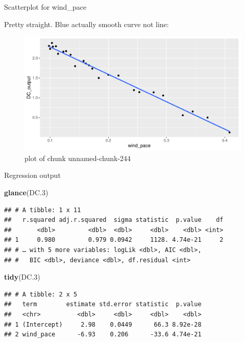 \documentclass[ignorenonframetext,]{beamer}
\newenvironment{Shaded}{\begin{snugshade}}{\end{snugshade}}
\newcommand{\FloatTok}[1]{\textcolor[rgb]{0.00,0.00,0.81}{#1}}
\newcommand{\KeywordTok}[1]{\textcolor[rgb]{0.13,0.29,0.53}{\textbf{#1}}}
\newcommand{\NormalTok}[1]{#1}
\begin{document}
\begin{frame}{Scatterplot for wind\_pace}
\protect\hypertarget{scatterplot-for-wind_pace}{}

Pretty straight. Blue actually smooth curve not line:

\begin{figure}
\centering
\includegraphics{figure/unnamed-chunk-244-1.pdf}
\caption{plot of chunk unnamed-chunk-244}
\end{figure}

\end{frame}

\begin{frame}[fragile]{Regression output}
\protect\hypertarget{regression-output}{}

\begin{Shaded}
\begin{Highlighting}[]
\KeywordTok{glance}\NormalTok{(DC}\FloatTok{.3}\NormalTok{)}
\end{Highlighting}
\end{Shaded}

\begin{verbatim}
## # A tibble: 1 x 11
##   r.squared adj.r.squared  sigma statistic  p.value    df
##       <dbl>         <dbl>  <dbl>     <dbl>    <dbl> <int>
## 1     0.980         0.979 0.0942     1128. 4.74e-21     2
## # … with 5 more variables: logLik <dbl>, AIC <dbl>,
## #   BIC <dbl>, deviance <dbl>, df.residual <int>
\end{verbatim}

\begin{Shaded}
\begin{Highlighting}[]
\KeywordTok{tidy}\NormalTok{(DC}\FloatTok{.3}\NormalTok{)}
\end{Highlighting}
\end{Shaded}

\begin{verbatim}
## # A tibble: 2 x 5
##   term        estimate std.error statistic  p.value
##   <chr>          <dbl>     <dbl>     <dbl>    <dbl>
## 1 (Intercept)     2.98    0.0449      66.3 8.92e-28
## 2 wind_pace      -6.93    0.206      -33.6 4.74e-21
\end{verbatim}

\end{frame}
\end{document}
